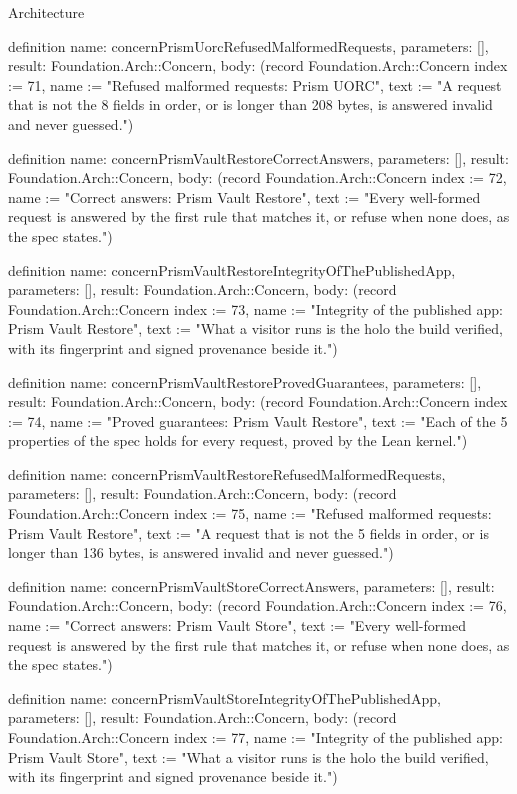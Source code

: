 \begin{lexlean}{Architecture}
\begin{semanticmodule}
definition{
  name: concernPrismUorcRefusedMalformedRequests,
  parameters: [],
  result: Foundation.Arch::Concern,
  body: (record Foundation.Arch::Concern {index := 71, name := "Refused malformed requests: Prism UORC", text := "A request that is not the 8 fields in order, or is longer than 208 bytes, is answered invalid and never guessed."})
}

definition{
  name: concernPrismVaultRestoreCorrectAnswers,
  parameters: [],
  result: Foundation.Arch::Concern,
  body: (record Foundation.Arch::Concern {index := 72, name := "Correct answers: Prism Vault Restore", text := "Every well-formed request is answered by the first rule that matches it, or refuse when none does, as the spec states."})
}

definition{
  name: concernPrismVaultRestoreIntegrityOfThePublishedApp,
  parameters: [],
  result: Foundation.Arch::Concern,
  body: (record Foundation.Arch::Concern {index := 73, name := "Integrity of the published app: Prism Vault Restore", text := "What a visitor runs is the holo the build verified, with its fingerprint and signed provenance beside it."})
}

definition{
  name: concernPrismVaultRestoreProvedGuarantees,
  parameters: [],
  result: Foundation.Arch::Concern,
  body: (record Foundation.Arch::Concern {index := 74, name := "Proved guarantees: Prism Vault Restore", text := "Each of the 5 properties of the spec holds for every request, proved by the Lean kernel."})
}

definition{
  name: concernPrismVaultRestoreRefusedMalformedRequests,
  parameters: [],
  result: Foundation.Arch::Concern,
  body: (record Foundation.Arch::Concern {index := 75, name := "Refused malformed requests: Prism Vault Restore", text := "A request that is not the 5 fields in order, or is longer than 136 bytes, is answered invalid and never guessed."})
}

definition{
  name: concernPrismVaultStoreCorrectAnswers,
  parameters: [],
  result: Foundation.Arch::Concern,
  body: (record Foundation.Arch::Concern {index := 76, name := "Correct answers: Prism Vault Store", text := "Every well-formed request is answered by the first rule that matches it, or refuse when none does, as the spec states."})
}

definition{
  name: concernPrismVaultStoreIntegrityOfThePublishedApp,
  parameters: [],
  result: Foundation.Arch::Concern,
  body: (record Foundation.Arch::Concern {index := 77, name := "Integrity of the published app: Prism Vault Store", text := "What a visitor runs is the holo the build verified, with its fingerprint and signed provenance beside it."})
}


\end{semanticmodule}
\end{lexlean}
